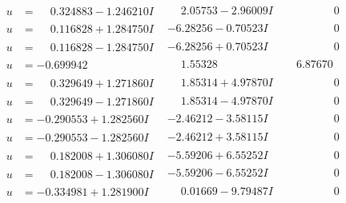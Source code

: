 \documentclass[1p]{elsarticle_modified}
\theoremstyle{definition}
\begin{document}
$$\begin{array}{c|c|c}
\begin{aligned}
u &= \phantom{-}0.324883 - 1.246210 I\end{aligned}
 & \phantom{-}2.05753 - 2.96009 I & \phantom{-0.000000 } 0 \\ \hline\begin{aligned}
u &= \phantom{-}0.116828 + 1.284750 I\end{aligned}
 & -6.28256 - 0.70523 I & \phantom{-0.000000 } 0 \\ \hline\begin{aligned}
u &= \phantom{-}0.116828 - 1.284750 I\end{aligned}
 & -6.28256 + 0.70523 I & \phantom{-0.000000 } 0 \\ \hline\begin{aligned}
u &= -0.699942\phantom{ +0.000000I}\end{aligned}
 & \phantom{-}1.55328\phantom{ +0.000000I} & \phantom{-}6.87670\phantom{ +0.000000I} \\ \hline\begin{aligned}
u &= \phantom{-}0.329649 + 1.271860 I\end{aligned}
 & \phantom{-}1.85314 + 4.97870 I & \phantom{-0.000000 } 0 \\ \hline\begin{aligned}
u &= \phantom{-}0.329649 - 1.271860 I\end{aligned}
 & \phantom{-}1.85314 - 4.97870 I & \phantom{-0.000000 } 0 \\ \hline\begin{aligned}
u &= -0.290553 + 1.282560 I\end{aligned}
 & -2.46212 - 3.58115 I & \phantom{-0.000000 } 0 \\ \hline\begin{aligned}
u &= -0.290553 - 1.282560 I\end{aligned}
 & -2.46212 + 3.58115 I & \phantom{-0.000000 } 0 \\ \hline\begin{aligned}
u &= \phantom{-}0.182008 + 1.306080 I\end{aligned}
 & -5.59206 + 6.55252 I & \phantom{-0.000000 } 0 \\ \hline\begin{aligned}
u &= \phantom{-}0.182008 - 1.306080 I\end{aligned}
 & -5.59206 - 6.55252 I & \phantom{-0.000000 } 0 \\ \hline\begin{aligned}
u &= -0.334981 + 1.281900 I\end{aligned}
 & \phantom{-}0.01669 - 9.79487 I & \phantom{-0.000000 } 0 \\ \hline\begin{aligned}

\end{aligned}
\end{array}$$
\end{document}
